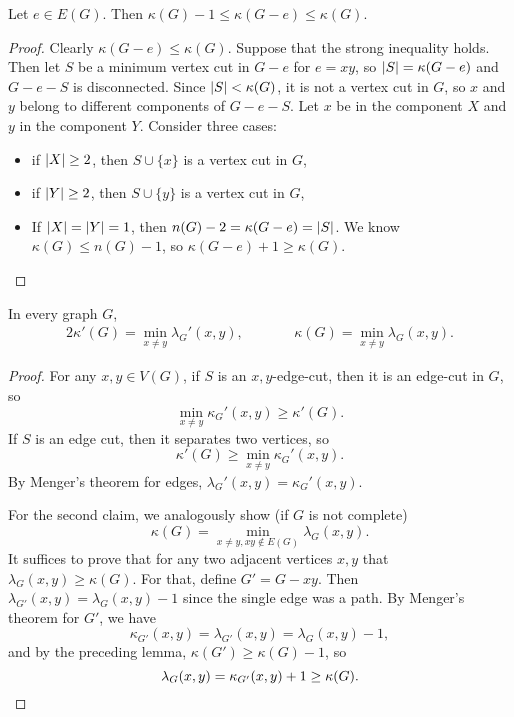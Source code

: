 \begin{lemma}
  Let $e \in E(G)$.
  Then $\kappa(G)-1 \le \kappa(G-e) \le \kappa(G)$.
\end{lemma}

\begin{proof}
  Clearly $\kappa(G-e) \le \kappa(G)$.
  Suppose that the strong inequality holds.
  Then let $S$ be a minimum vertex cut in $G-e$ for $e=xy$, so $\left| S \right| =
  \kappa(G-e)$ and $G-e-S$ is disconnected.
  Since $\left| S \right| < \kappa(G)$, it is not a vertex cut in $G$, so $x$ and $y$
  belong to different components of $G-e-S$.
  Let $x$ be in the component $X$ and $y$ in the component $Y$.
  Consider three cases:
  \begin{itemize}
  \item if $\left| X \right| \ge 2$, then $S \cup \{x\}$ is a vertex cut in $G$,
  \item if $\left| Y \right| \ge 2$, then $S \cup \{y\}$ is a vertex cut in $G$,
  \item If $\left| X \right| = \left| Y \right| = 1$, then $n(G)-2 = \kappa(G-e) = \left| S \right|$.
	We know $\kappa(G) \le n(G)-1$, so $\kappa(G-e) + 1 \ge \kappa(G)$.
	\qedhere
  \end{itemize}
\end{proof}

\begin{theorem}[Menger]
  In every graph $G$,
  \begin{alignat*}{2}
	\kappa'(G) = \min_{x \ne y} \lambda_G'(x,y),
	& \qquad &
			   \kappa(G) = \min_{x \ne y} \lambda_G(x,y).
  \end{alignat*}
\end{theorem}

\begin{proof}
  For any $x,y \in V(G)$, if $S$ is an $x,y$-edge-cut, then it is an edge-cut in
  $G$, so
  \[
	\min_{x \ne y} \kappa_G'(x,y) \ge \kappa'(G).
  \]
  If $S$ is an edge cut, then it separates two vertices, so
  \[
	\kappa'(G) \ge \min_{x\ne y} \kappa_G'(x,y).
  \]
  By Menger's theorem for edges, $\lambda_G'(x,y) = \kappa_G'(x,y)$.

  For the second claim, we analogously show (if $G$ is not complete)
  \[
	\kappa(G) = \min_{x \ne y, xy \notin E(G)} \lambda_G(x,y).
  \]
  It suffices to prove that for any two adjacent vertices $x,y$ that
  $\lambda_G(x,y) \ge \kappa(G)$.
  For that, define $G' = G - xy$.
  Then $\lambda_{G'}(x,y) = \lambda_G(x,y) - 1$ since the single edge was a
  path.
  By Menger's theorem for $G'$, we have
  \[
	\kappa_{G'}(x,y) = \lambda_{G'}(x,y) = \lambda_G(x,y)-1,
  \]
  and by the preceding lemma, $\kappa(G') \ge \kappa(G)-1$, so
  \[
	\lambda_G(x,y) = \kappa_{G'}(x,y)+1 \ge \kappa(G).
	\qedhere
  \]
\end{proof}

